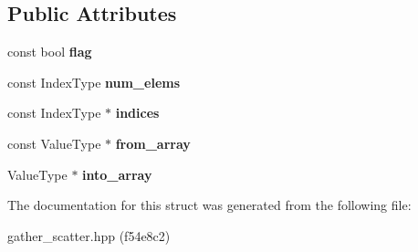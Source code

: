\subsection*{Public Attributes}
\begin{DoxyCompactItemize}
\item 
\mbox{\label{structGatherScatter_ae0a023c43a44d3398c337759f73c450a}} 
const bool {\bfseries flag}
\item 
\mbox{\label{structGatherScatter_a7a77a08c144b7640c2e595ffcb95e9f6}} 
const Index\+Type {\bfseries num\+\_\+elems}
\item 
\mbox{\label{structGatherScatter_acfd3e8f7792e7e8d84558210c80feb8d}} 
const Index\+Type $\ast$ {\bfseries indices}
\item 
\mbox{\label{structGatherScatter_adbdf8c559625f452f62843c36a629993}} 
const Value\+Type $\ast$ {\bfseries from\+\_\+array}
\item 
\mbox{\label{structGatherScatter_a389b25cdf1bee5084d19f6df1ea53937}} 
Value\+Type $\ast$ {\bfseries into\+\_\+array}
\end{DoxyCompactItemize}


The documentation for this struct was generated from the following file\+:\begin{DoxyCompactItemize}
\item 
gather\+\_\+scatter.\+hpp (f54e8c2)\end{DoxyCompactItemize}
